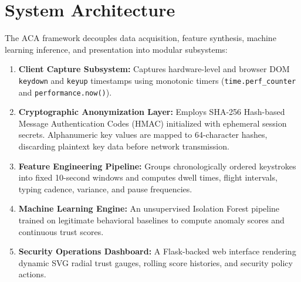 \documentclass[12pt, a4paper, oneside]{report}
\begin{document}
\section{System Architecture}
The ACA framework decouples data acquisition, feature synthesis, machine learning inference, and presentation into modular subsystems:
\begin{enumerate}
    \item \textbf{Client Capture Subsystem:} Captures hardware-level and browser DOM \texttt{keydown} and \texttt{keyup} timestamps using monotonic timers (\texttt{time.perf\_counter} and \texttt{performance.now()}).
    \item \textbf{Cryptographic Anonymization Layer:} Employs SHA-256 Hash-based Message Authentication Codes (HMAC) initialized with ephemeral session secrets. Alphanumeric key values are mapped to 64-character hashes, discarding plaintext key data before network transmission.
    \item \textbf{Feature Engineering Pipeline:} Groups chronologically ordered keystrokes into fixed 10-second windows and computes dwell times, flight intervals, typing cadence, variance, and pause frequencies.
    \item \textbf{Machine Learning Engine:} An unsupervised Isolation Forest pipeline trained on legitimate behavioral baselines to compute anomaly scores and continuous trust scores.
    \item \textbf{Security Operations Dashboard:} A Flask-backed web interface rendering dynamic SVG radial trust gauges, rolling score histories, and security policy actions.
\end{enumerate}
\end{document}
